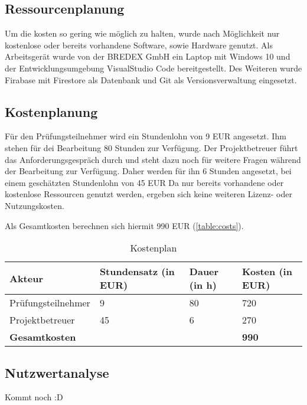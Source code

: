 \documentclass[12pt]{article}
\begin{document}
\subsection{Ressourcenplanung}
Um die kosten so gering wie möglich zu halten, wurde nach Möglichkeit nur
kostenlose oder bereits vorhandene Software, sowie Hardware genutzt.
Als Arbeitsgerät wurde von der BREDEX GmbH ein Laptop mit Windows 10 und der
Entwicklungsumgebung VisualStudio Code bereitgestellt.
Des Weiteren wurde Firabase mit Firestore als Datenbank und Git als 
Versionsverwaltung eingesetzt.

\subsection{Kostenplanung}
Für den Prüfungsteilnehmer wird ein Stundenlohn von 9 EUR angesetzt.
Ihm stehen für dei Bearbeitung 80 Stunden zur Verfügung.
Der Projektbetreuer führt das Anforderungsgespräch durch und steht 
dazu noch für weitere Fragen während der Bearbeitung zur Verfügung.
Daher werden für ihn 6 Stunden angesetzt, bei einem geschätzten 
Stundenlohn von 45 EUR
Da nur bereits vorhandene oder kostenlose Ressourcen genutzt werden,
ergeben sich keine weiteren Lizenz- oder Nutzungskosten.

Als Gesamtkosten berechnen sich hiermit 990 EUR (\autoref{table:costs}).

\begin{table}[H]
    \centering
    \begin{tabular}{|l|l|l|l|}
        \hline
        Akteur & Stundensatz (in EUR) & Dauer (in h) & Kosten (in EUR) \\
        \hline
        Prüfungsteilnehmer & 9 & 80 & 720 \\
        Projektbetreuer & 45 & 6 & 270 \\
        \hline
        \textbf{Gesamtkosten} &&& \textbf{990} \\
        \hline
        
    \end{tabular}
    \caption{Kostenplan}
    \label{table:costs}
\end{table}


\subsection{Nutzwertanalyse}

Kommt noch :D



%
%
\end{document}
